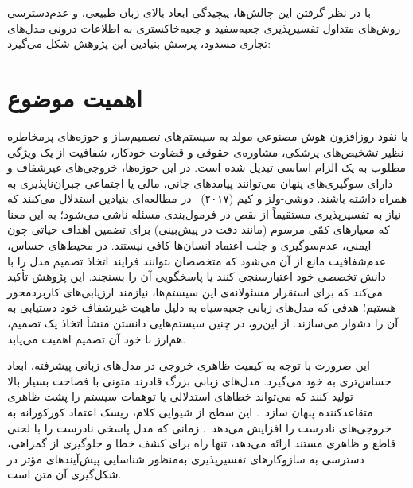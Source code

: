 با در نظر گرفتن این چالش‌ها، پیچیدگی ابعاد بالای زبان طبیعی، و عدم‌دسترسی روش‌های متداول تفسیرپذیری جعبه‌سفید و جعبه‌خاکستری به اطلاعات درونی مدل‌های تجاری مسدود، پرسش بنیادین این پژوهش شکل می‌گیرد:

\vspace{0.25cm}
\vspace{0.25cm}


\section{اهمیت موضوع}\label{sec:1-2}

با نفوذ روزافزون هوش مصنوعی مولد به سیستم‌های تصمیم‌ساز و حوزه‌های پرمخاطره نظیر تشخیص‌های پزشکی، مشاوره‌ی حقوقی و قضاوت خودکار، شفافیت از یک ویژگی مطلوب به یک الزام اساسی تبدیل شده است. در این حوزه‌ها، خروجی‌های غیرشفاف و دارای سوگیری‌های پنهان می‌توانند پیامدهای جانی، مالی یا اجتماعی جبران‌ناپذیری به همراه داشته باشند. دوشی-ولز و کیم (۲۰۱۷)~\cite{doshivelez2017rigorous} در مطالعه‌ای بنیادین استدلال می‌کنند که نیاز به تفسیرپذیری مستقیماً از نقص در فرمول‌بندی مسئله ناشی می‌شود؛ به این معنا که معیارهای کمّی مرسوم (مانند دقت در پیش‌بینی) برای تضمین اهداف حیاتی چون ایمنی، عدم‌سوگیری و جلب اعتماد انسان‌ها کافی نیستند. در محیط‌های حساس، عدم‌شفافیت مانع از آن می‌شود که متخصصان بتوانند فرایند اتخاذ تصمیم مدل را با دانش تخصصی خود اعتبارسنجی کنند یا پاسخگویی آن را بسنجند. این پژوهش تأکید می‌کند که برای استقرار مسئولانه‌ی این سیستم‌ها، نیازمند ارزیابی‌های کاربردمحور هستیم؛ هدفی که مدل‌های زبانی جعبه‌سیاه به دلیل ماهیت غیرشفاف خود دستیابی به آن را دشوار می‌سازند. از این‌رو، در چنین سیستم‌هایی دانستن منشأ اتخاذ یک تصمیم، هم‌ارز با خود آن تصمیم اهمیت می‌یابد.

این ضرورت با توجه به کیفیت ظاهری خروجی در مدل‌های زبانی پیشرفته، ابعاد حساس‌تری به خود می‌گیرد. مدل‌های زبانی بزرگ قادرند متونی با فصاحت بسیار بالا تولید کنند که می‌تواند خطاهای استدلالی یا توهمات سیستم را پشت ظاهری متقاعدکننده پنهان سازد~\cite{turpin2023language}. این سطح از شیوایی کلام، ریسک اعتماد کورکورانه به خروجی‌های نادرست را افزایش می‌دهد~\cite{huang2026hallucinations}. زمانی که مدل پاسخی نادرست را با لحنی قاطع و ظاهری مستند ارائه می‌دهد، تنها راه برای کشف خطا و جلوگیری از گمراهی، دسترسی به سازوکارهای تفسیرپذیری به‌منظور شناسایی پیش‌آیندهای مؤثر در شکل‌گیری آن متن است.

